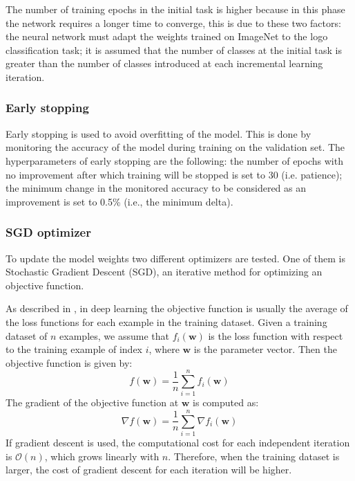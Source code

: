 The number of training epochs in the initial task is higher because in this phase the network requires a longer time to converge, this is due to these two factors: the neural network must adapt the weights trained on ImageNet to the logo classification task;
it is assumed that the number of classes at the initial task is greater than the number of classes introduced at each incremental learning iteration.

\subsubsection{Early stopping}
Early stopping is used to avoid overfitting of the model.
This is done by monitoring the accuracy of the model during training on the validation set.
The hyperparameters of early stopping are the following: the number of epochs with no improvement after which training will be stopped is set to 30 (i.e. patience); the minimum change in the monitored accuracy to be considered as an improvement is set to 0.5\% (i.e., the minimum delta).

\subsubsection{SGD optimizer}
\label{sec:sgd_opt}
To update the model weights two different optimizers are tested.
One of them is Stochastic Gradient Descent (SGD), an iterative method for optimizing an objective function.

As described in \cite{zhang2021dive}, in deep learning the objective function is usually the average of the loss functions for each example in the training dataset. Given a training dataset of $n$ examples, we assume that $f_i(\textbf{w})$ is the loss function with respect to the training example of index $i$, where $\textbf{w}$ is the parameter vector. Then the objective function is given by:
\begin{equation}
    f(\textbf{w}) = \frac{1}{n} \sum_{i=1}^n f_i(\textbf{w})
\end{equation}
The gradient of the objective function at $\textbf{w}$ is computed as:
\begin{equation}
    \nabla f(\textbf{w}) = \frac{1}{n} \sum_{i=1}^n \nabla f_i(\textbf{w})
\end{equation}
If gradient descent is used, the computational cost for each independent iteration is $\mathcal{O}(n)$, which grows linearly with $n$. Therefore, when the training dataset is larger, the cost of gradient descent for each iteration will be higher.

